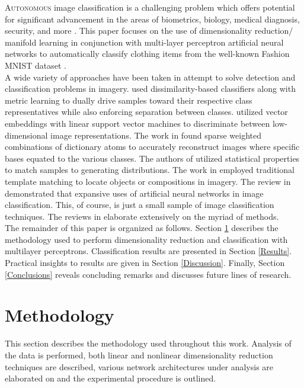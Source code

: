 \documentclass[conference]{IEEEtran}
\begin{document}
\lettrine{A}{utonomous} image classification is a challenging problem which offers potential for significant advancement in the areas of biometrics, biology, medical diagnosis, security, and more \cite{Prasad2015Review,Lu2007Review}.  This paper focuses on the use of dimensionality reduction/ manifold learning in conjunction with multi-layer perceptron artificial neural networks to automatically classify clothing items from the well-known Fashion MNIST dataset \cite{Xiao2017FashionMNIST}.  \\
\indent A wide variety of approaches have been taken in attempt to solve detection and classification problems in imagery.  \cite{Mensink2013KNN} used dissimilarity-based classifiers along with metric learning to dually drive samples toward their respective class representatives while also enforcing separation between classes.  \cite{Sanchez2011svm,Lin2011svm} utilized vector embeddings with linear support vector machines to discriminate between low-dimensional image representations.  The work in \cite{Shao2019DictionaryLearning} found sparse weighted combinations of dictionary atoms to accurately reconstruct images where specific bases equated to the various  classes.  The authors of \cite{Timofte2013NaiveBayes} utilized statistical properties to match samples to generating distributions.  The work in \cite{Swaroop2016TemplateMatching} employed traditional template matching to locate objects or compositions in imagery.  The review in \cite{Driss2017MLPandCNN} demonstrated that expansive uses of artificial neural networks in image classification.  This, of course, is just a small sample of image classification techniques.  The reviews in \cite{Prasad2015Review,Lu2007Review} elaborate extensively on the myriad of methods. \\
\indent The remainder of this paper is organized as follows.  Section \ref{Methodology} describes the methodology used to perform dimensionality reduction and classification with multilayer perceptrons.  Classification results are presented in Section \ref*{Results}.  Practical insights to results are given in Section \ref{Discussion}.  Finally, Section \ref{Conclusions} reveals concluding remarks and discusses future lines of research.



\section{Methodology} \label{Methodology}
	This section describes the methodology used throughout this work.  Analysis of the data is performed, both linear and nonlinear dimensionality reduction techniques are described, various network architectures under analysis are elaborated on and the experimental procedure is outlined.
\end{document}
